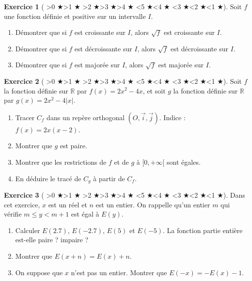 \documentclass[12pt,a4paper]{article}
\newcommand{\diff}[1]{%
  \textcolor{orange!80!black}{\ifnum#1>0 $\bigstar$\fi\ifnum#1>1 $\bigstar$\fi
  \ifnum#1>2 $\bigstar$\fi\ifnum#1>3 $\bigstar$\fi\ifnum#1>4 $\bigstar$\fi}%
  \textcolor{gray!40}{\ifnum#1<5 $\bigstar$\fi\ifnum#1<4 $\bigstar$\fi
  \ifnum#1<3 $\bigstar$\fi\ifnum#1<2 $\bigstar$\fi\ifnum#1<1 $\bigstar$\fi}}
\theoremstyle{plain}
\theoremstyle{definition}
\newtheorem{exercise}{Exercice}
\theoremstyle{remark}
\begin{document}
\begin{exercise}[\diff{1}]
Soit \(f\) une fonction définie et positive sur un intervalle \(I\).
\begin{enumerate}[label=\alph*)]
  \item Démontrer que si \(f\) est croissante sur \(I\), alors \(\sqrt{f}\) est croissante sur \(I\).
  \item Démontrer que si \(f\) est décroissante sur \(I\), alors \(\sqrt{f}\) est décroissante sur \(I\).
  \item Démontrer que si \(f\) est majorée sur \(I\), alors \(\sqrt{f}\) est majorée sur \(I\).
\end{enumerate}
\label{ex:sqrt_theorem}
\end{exercise}

\begin{exercise}[\diff{1}]
Soit $f$ la fonction définie sur $\mathbb{R}$ par $f(x) = 2x^2 - 4x$, et soit $g$ la
fonction définie sur $\mathbb{R}$ par $g(x) = 2x^2 - 4\lvert x \rvert$.
\begin{enumerate}[label=\alph*)]
  \item Tracer $C_f$ dans un repère orthogonal $(O, \vec{i}, \vec{j})$. Indice :
  $f(x) = 2x(x - 2)$.
  \item Montrer que $g$ est paire.
  \item Montrer que les restrictions de $f$ et de $g$ à $[0, +\infty[$ sont égales.
  \item En déduire le tracé de $C_g$ à partir de $C_f$.
\end{enumerate}
\label{ex:trinomial_parity}
\end{exercise}

\begin{exercise}[\diff{4}]
Dans cet exercice, $x$ est un réel et $n$ est un entier. On rappelle qu'un entier $m$
qui vérifie $m \le y < m + 1$ est égal à $E(y)$.
\begin{enumerate}[label=\alph*)]
  \item Calculer $E(2.7)$, $E(-2.7)$, $E(5)$ et $E(-5)$. La fonction partie entière
  est-elle paire ? impaire ?
  \item Montrer que $E(x + n) = E(x) + n$.
  \item On suppose que $x$ n'est pas un entier. Montrer que
  $E(-x) = -E(x) - 1$.
\end{enumerate}
\label{ex:partie_entiere}
\end{exercise}
\end{document}
